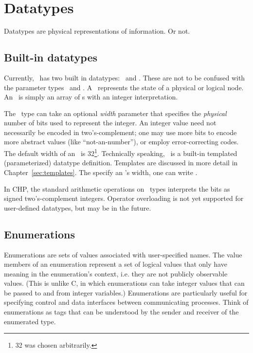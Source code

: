 

\chapter{Datatypes}
\label{sec:datatypes}

Datatypes are physical representations of information.  
Or not.  


\section{Built-in datatypes}
\label{sec:datatypes:builtin}

Currently, \hac\ has two built in datatypes: \bool\ and \int.  
These are not to be confused with the parameter types \pbool\ and \pint.  
A \bool\ represents the state of a physical or logical node.  
An \int\ is simply an array of \bool s with an integer interpretation.  

The \int\ type can take an optional \emph{width} parameter that specifies
the \emph{physical} number of bits used to represent the integer.  
An integer value need not necessarily be encoded in two's-complement; 
one may use more bits to encode more abstract values (like ``not-an-number''), 
or employ error-correcting codes.  
The default width of an \int\ is 32\footnote{32 was chosen arbitrarily.}.
Technically speaking, \int\ is a built-in templated (parameterized) 
datatype definition.  
Templates are discussed in more detail in Chapter~\ref{sec:templates}.  
The specify an \int's width, one can write \ttt{>}.  

In CHP, the standard arithmetic operations on \int\ types interprets
the bits as signed two's-complement integers.  
Operator overloading is not yet supported for user-defined datatypes, 
but may be in the future.  

\section{Enumerations}
\label{sec:datatype:enum}

Enumerations are sets of values associated with user-specified names.  
The value members of an enumeration represent a set of 
logical values that only have meaning in the enumeration's context, 
i.e. they are not publicly observable values.  
(This is unlike C, in which enumerations can take integer values that 
can be passed to and from integer variables.)
Enumerations are particularly useful for specifying 
control and data interfaces between communicating processes.  
Think of enumerations as tags that can be understood by 
the sender and receiver of the enumerated type.  


